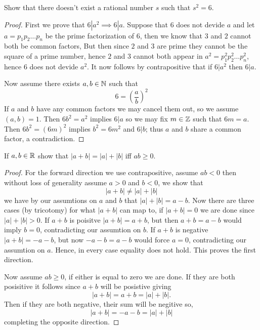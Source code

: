 

\maketitle

\question
Show that there doesn't exist a rational number $s$ such that $s^2 = 6$. 


\begin{proof}
    First we prove that $6|a^2 \implies 6|a$. Suppose that $6$ does not devide $a$ and let $a = p_1p_2 \dots p_n$ 
    be the prime factorization of $6$, then we know that $3$ and $2$ cannot both be common factors,  
    But then since $2$ and $3$ are prime they cannot be the square of a prime number, hence $2$ and $3$ cannot both 
    appear in $a^2 = p_1^2 p_2^2 \dots p_n^2$, hence $6$ does not devide $a^2$. It now follows by contrapositive that 
    if $6|a^2$ then $6|a$. 

    Now assume there exists $a, b \in \mathbb{N}$ such that 
    \[6 = (\frac{a}{b})^2 \]
    If $a$ and $b$ have any common factors we may cancel them out, so we assume $(a, b) = 1$. 
    Then $6b^2 = a^2$ implies $6|a$ so we may fix $m \in \mathbb{Z}$ such that $6m = a$. Then 
    $6b^2 = (6m)^2$ implies $b^2 = 6m^2$ and $6|b$; thus $a$ and $b$ share a common factor, 
    a contradiction. 

\end{proof}

\question
If $a, b \in \mathbb{R}$ show that $|a + b| = |a| + |b| $ iff $ab \geq 0$. 


\begin{proof}
    For the forward direction we use contrapositive, assume $ab < 0$ then without loss of generality assume $a > 0$ and $b<0$, we show that 
    \[|a +b | \neq |a| + |b| \] 
    we have by our assumtions on $a$ and $b$ that $|a| + |b| = a - b$. 
    Now there are three cases (by tricotomy) for what $|a+b|$ can map to, if $|a + b| = 0$
    we are done since $| a| + |b| > 0$. 
    If $a + b$ is poisitve $|a + b| = a + b$, but then $a + b = a - b$ would imply $b = 0$, contradicting our assumtion on $b$.
    If $a + b$ is negative $|a + b| = -a -b$, but now $-a -b = a - b$ would force $a = 0$, contradicting our assumtion on $a$. 
    Hence, in every case equality does not hold. This proves the first direction.
    
    Now assume $ab \geq 0$, if either is equal to zero we are done. If they are both posisitive it follows since $a + b$ will be posistive giving 
    \[|a + b| = a + b = |a| + |b|.\]
    Then if they are both negative, their sum will be negitive so,
    \[|a + b| = -a - b = |a| + |b|\]
    completing the opposite direction. 
\end{proof}

